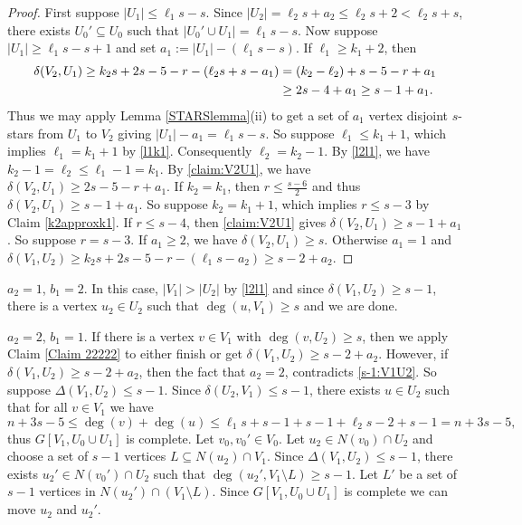\documentclass[oneside,12pt]{memoir}
\begin{document}
\begin{proof}
First suppose $|U_1|\leq \ell_1s-s$.  Since $|U_2|=\ell_2s+a_2\leq \ell_2s+2<\ell_2s+s$, there exists $U_0'\subseteq U_0$ such that $|U_0'\cup U_1|=\ell_1s-s$.  Now suppose $|U_1|\geq \ell_1s-s+1$ and set $a_1:=|U_1|-(\ell_1s-s)$.  If $\ell_1\geq k_1+2$, then 
\begin{align}
\delta(V_2, U_1)\geq k_2s+2s-5-r-(\ell_2s+s-a_1)&=(k_2-\ell_2)+s-5-r+a_1 \notag \\
&\geq 2s-4+a_1 \geq s-1+a_1.  \label{claim:V2U1}
\end{align}
Thus we may apply Lemma \ref{STARSlemma}(ii) to get a set of $a_1$ vertex disjoint $s$-stars from $U_1$ to $V_2$ giving $|U_1|-a_1=\ell_1s-s$.  So suppose $\ell_1\leq k_1+1$, which implies $\ell_1=k_1+1$ by \eqref{l1k1}.  Consequently $\ell_2=k_2-1$.  By \eqref{l2l1}, we have $k_2-1=\ell_2\leq \ell_1-1=k_1$.  By \eqref{claim:V2U1}, we have $\delta(V_2, U_1)\geq 2s-5-r+a_1$.  If $k_2=k_1$, then $r\leq \frac{s-6}{2}$ and thus $\delta(V_2, U_1)\geq s-1+a_1$. So suppose $k_2=k_1+1$, which implies $r\leq s-3$ by Claim \ref{k2approxk1}.  If $r\leq s-4$, then \eqref{claim:V2U1} gives $\delta(V_2, U_1)\geq s-1+a_1$.  So suppose $r=s-3$.  If $a_1\geq 2$, we have $\delta(V_2, U_1)\geq s$.  Otherwise $a_1=1$ and $\delta(V_1, U_2)\geq k_2s+2s-5-r-(\ell_1s-a_2)\geq s-2+a_2$.
\end{proof}


$a_2=1$, $b_1=2$.  In this case, $|V_1|>|U_2|$ by \eqref{l2l1} and since $\delta(V_1, U_2)\geq s-1$, there is a vertex $u_2\in U_2$ such that $\deg(u, V_1)\geq s$ and we are done.

$a_2=2$, $b_1=1$.  If there is a vertex $v\in V_1$ with $\deg(v, U_2)\geq s$, then we apply Claim \ref{Claim 22222} to either finish or get $\delta(V_1, U_2)\geq s-2+a_2$.  However, if $\delta(V_1, U_2)\geq s-2+a_2$, then the fact that $a_2=2$, contradicts \eqref{s-1:V1U2}. So suppose $\Delta(V_1, U_2)\leq s-1$.  Since $\delta(U_2, V_1)\leq s-1$, there exists $u\in U_2$ such that for all $v\in V_1$ we have $$n+3s-5\leq \deg(v)+\deg(u)\leq \ell_1s+s-1+s-1+\ell_2s-2+s-1=n+3s-5,$$ thus $G[V_1, U_0\cup U_1]$ is complete.  Let $v_0,v_0'\in V_0$.  Let $u_2\in N(v_0)\cap U_2$ and choose a set of $s-1$ vertices $L\subseteq N(u_2)\cap V_1$.  Since $\Delta(V_1, U_2)\leq s-1$, there exists $u_2'\in N(v_0')\cap U_2$ such that $\deg(u_2', V_1\setminus L)\geq s-1$.  Let $L'$ be a set of $s-1$ vertices in $N(u_2')\cap (V_1\setminus L)$.  Since $G[V_1, U_0\cup U_1]$ is complete we can move $u_2$ and $u_2'$.
\end{document}
